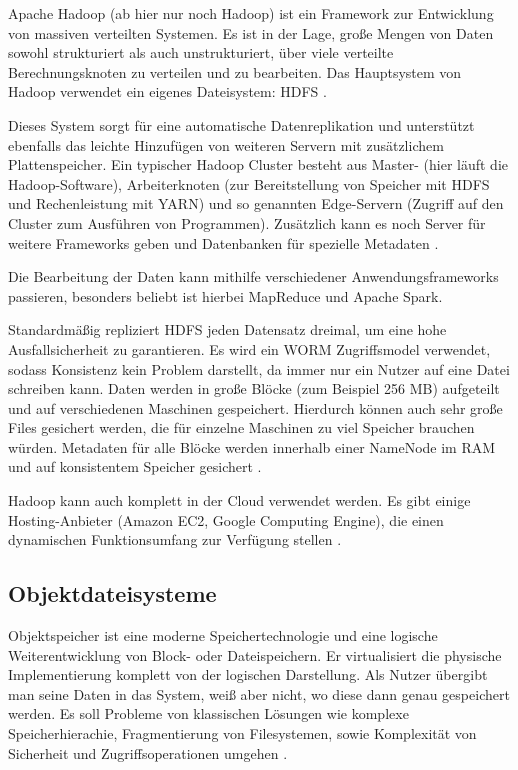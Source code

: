Apache Hadoop (ab hier nur noch Hadoop) ist ein Framework zur Entwicklung von massiven verteilten Systemen. Es ist in der Lage, große Mengen von Daten sowohl strukturiert als auch unstrukturiert, über viele verteilte Berechnungsknoten zu verteilen und zu bearbeiten. Das Hauptsystem von Hadoop verwendet ein eigenes Dateisystem: \ac{HDFS} \parencite[Kap. I,1]{alapati.2016}.

Dieses System sorgt für eine automatische Datenreplikation und unterstützt ebenfalls das leichte Hinzufügen von weiteren Servern mit zusätzlichem Plattenspeicher. Ein typischer Hadoop Cluster besteht aus Master- (hier läuft die Hadoop-Software), Arbeiterknoten (zur Bereitstellung von Speicher mit \ac{HDFS} und Rechenleistung mit \ac{YARN}) und so genannten Edge-Servern (Zugriff auf den Cluster zum Ausführen von Programmen). Zusätzlich kann es noch Server für weitere Frameworks geben und Datenbanken für spezielle Metadaten \parencite[Kap. I,1]{alapati.2016}.

Die Bearbeitung der Daten kann mithilfe verschiedener Anwendungsframeworks passieren, besonders beliebt ist hierbei MapReduce und Apache Spark.

Standardmäßig repliziert HDFS jeden Datensatz dreimal, um eine hohe Ausfallsicherheit zu garantieren. Es wird ein \ac{WORM} Zugriffsmodel verwendet, sodass Konsistenz kein Problem darstellt, da immer nur ein Nutzer auf eine Datei schreiben kann. Daten werden in große Blöcke (zum Beispiel 256 MB) aufgeteilt und auf verschiedenen Maschinen gespeichert. Hierdurch können auch sehr große Files gesichert werden, die für einzelne Maschinen zu viel Speicher brauchen würden. Metadaten für alle Blöcke werden innerhalb einer NameNode im RAM und auf konsistentem Speicher gesichert  \parencite[Kap. I,2]{alapati.2016}.

Hadoop kann auch komplett in der Cloud verwendet werden. Es gibt einige Hosting-Anbieter (Amazon EC2, Google Computing Engine), die einen dynamischen Funktionsumfang zur Verfügung stellen \parencite[Kap. I, 1]{alapati.2016}.

\subsection{Objektdateisysteme} \label{subsec:objectstorage}

Objektspeicher ist eine moderne Speichertechnologie und eine logische Weiterentwicklung von Block- oder Dateispeichern. Er virtualisiert die physische Implementierung komplett von der logischen Darstellung. Als Nutzer übergibt man seine Daten in das System, weiß aber nicht, wo diese dann genau gespeichert werden. Es soll Probleme von klassischen Lösungen wie komplexe Speicherhierachie, Fragmentierung von Filesystemen, sowie Komplexität von Sicherheit und Zugriffsoperationen umgehen \parencite[Kap. 1, Object Storage]{varma.2015}.

